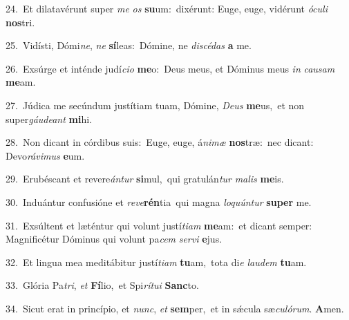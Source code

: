 {\numbfont\textcolor{\numbcolor}{24.}}~Et dilatavérunt super \textit{me} \textit{os} \textbf{su}\-um:~\star dixérunt: Euge, euge, vidérunt \textit{ó}\-\textit{cu}\textit{li} \textbf{nos}\-tri.\par
{\numbfont\textcolor{\numbcolor}{25.}}~Vidísti, Dómi\-\textit{ne}\-, \textit{ne} \textbf{sí}\-leas:~\star Dómine, ne \textit{di}\-\textit{scé}\textit{das} \textbf{a} me.\par
{\numbfont\textcolor{\numbcolor}{26.}}~Exsúrge et inténde judí\-\textit{ci}\-\textit{o} \textbf{me}\-o:~\star Deus meus, et Dóminus meus \textit{in} \textit{cau}\-\textit{sam} \textbf{me}\-am.\par
{\numbfont\textcolor{\numbcolor}{27.}}~Júdica me secúndum justítiam tuam, Dómine, \textit{De}\-\textit{us} \textbf{me}\-us,~\star et non super\-\textit{gáu}\-\textit{de}\textit{ant} \textbf{mi}\-hi.\par
{\numbfont\textcolor{\numbcolor}{28.}}~Non dicant in córdibus suis:~\dagger Euge, euge, á\-\textit{ni}\-\textit{mæ} \textbf{nos}\-træ:~\star nec dicant: Devo\-\textit{rá}\-\textit{vi}\textit{mus} \textbf{e}\-um.\par
{\numbfont\textcolor{\numbcolor}{29.}}~Erubéscant et revere\-\textit{án}\-\textit{tur} \textbf{si}\-mul,~\star qui gratulán\textit{tur} \textit{ma}\-\textit{lis} \textbf{me}\-is.\par
{\numbfont\textcolor{\numbcolor}{30.}}~Induántur confusióne et \textit{re}\-\textit{ve}\textbf{rén}tia~\star qui magna \textit{lo}\-\textit{quún}\textit{tur} \textbf{su}\-\textbf{per} me.\par
{\numbfont\textcolor{\numbcolor}{31.}}~Exsúltent et læténtur qui volunt justí\-\textit{ti}\-\textit{am} \textbf{me}\-am:~\star et dicant semper: Magnificétur Dóminus qui volunt pa\textit{cem} \textit{ser}\-\textit{vi} \textbf{e}\-jus.\par
{\numbfont\textcolor{\numbcolor}{32.}}~Et lingua mea meditábitur justí\-\textit{ti}\-\textit{am} \textbf{tu}\-am,~\star tota di\textit{e} \textit{lau}\-\textit{dem} \textbf{tu}\-am.\par
{\numbfont\textcolor{\numbcolor}{33.}}~Glória Pa\-\textit{tri}\-, \textit{et} \textbf{Fí}\-lio,~\star et Spi\-\textit{rí}\-\textit{tu}\textit{i} \textbf{Sanc}\-to.\par
{\numbfont\textcolor{\numbcolor}{34.}}~Sicut erat in princípio, et \textit{nunc}\-, \textit{et} \textbf{sem}\-per,~\star et in sǽcula sæ\-\textit{cu}\-\textit{ló}\textit{rum}. \textbf{A}\-men.\par
